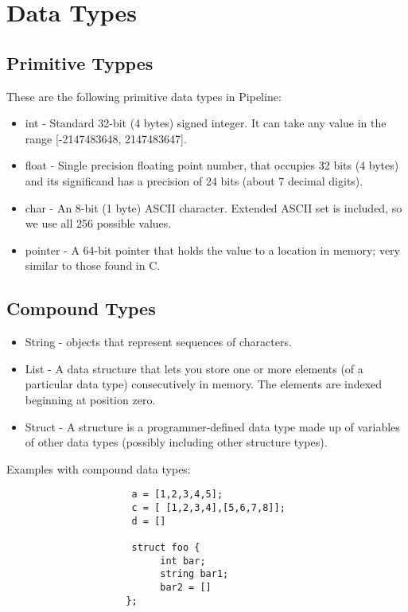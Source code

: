 \documentclass[./LRM_main.tex]{subfiles}
\begin{document}


\chapter{Data Types}



\section{Primitive Typpes}
These are the following primitive data types in Pipeline:
\begin{itemize}
    \item int -  Standard 32-bit (4 bytes) signed integer. It can take any value in the range [-2147483648, 2147483647].
    \item float - Single precision floating point number, that occupies 32 bits (4 bytes) and its significand has a precision of 24 bits (about 7 decimal digits). 
    \item char - An 8-bit (1 byte) ASCII character. Extended ASCII set is included, so we use all 256 possible values.
    \item pointer - A 64-bit pointer that holds the value to a location in memory; very similar to those found in C.
\end{itemize}

\section{Compound Types}
\begin{itemize}
    \item String - objects that represent sequences of characters. 
    \item List - A data structure that lets you store one or more elements (of a particular data type) consecutively in memory. The elements are indexed beginning at position zero. 
    \item Struct - A structure is a programmer-defined data type made up of variables of other data types (possibly including other structure types).
\end{itemize}

Examples with compound data types:
\begin{lstlisting}
                      a = [1,2,3,4,5];
		              c = [ [1,2,3,4],[5,6,7,8]];
		              d = []
		              
		              struct foo {
			               int bar;
			               string bar1;
			               bar2 = []
                     };

\end{lstlisting}



\end{document}
